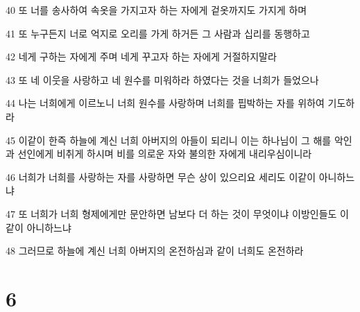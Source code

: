 \par 40 또 너를 송사하여 속옷을 가지고자 하는 자에게 겉옷까지도 가지게 하며
\par 41 또 누구든지 너로 억지로 오리를 가게 하거든 그 사람과 십리를 동행하고
\par 42 네게 구하는 자에게 주며 네게 꾸고자 하는 자에게 거절하지말라
\par 43 또 네 이웃을 사랑하고 네 원수를 미워하라 하였다는 것을 너희가 들었으나
\par 44 나는 너희에게 이르노니 너희 원수를 사랑하며 너희를 핍박하는 자를 위하여 기도하라
\par 45 이같이 한즉 하늘에 계신 너희 아버지의 아들이 되리니 이는 하나님이 그 해를 악인과 선인에게 비취게 하시며 비를 의로운 자와 불의한 자에게 내리우심이니라
\par 46 너희가 너희를 사랑하는 자를 사랑하면 무슨 상이 있으리요 세리도 이같이 아니하느냐
\par 47 또 너희가 너희 형제에게만 문안하면 남보다 더 하는 것이 무엇이냐 이방인들도 이같이 아니하느냐
\par 48 그러므로 하늘에 계신 너희 아버지의 온전하심과 같이 너희도 온전하라

\chapter{6}

